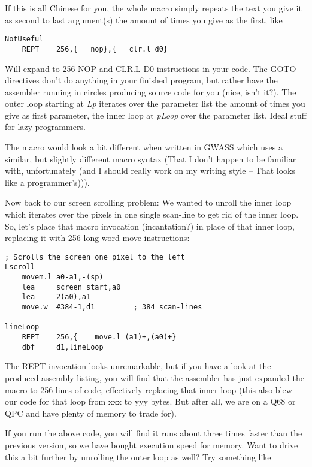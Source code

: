 If this is all Chinese for you, the whole macro simply repeats the text
you give it as second to last argument(s) the amount of times you give
as the first, like

\begin{lstlisting}[firstnumber=1,caption={A simple REPT example}]
NotUseful
    REPT    256,{   nop},{   clr.l d0}
\end{lstlisting}

Will expand to 256 NOP and CLR.L D0 instructions in your code. The GOTO
directives don't do anything in your finished program, but rather have
the assembler running in circles producing source code for you (nice,
isn't it?). The outer loop starting at \emph{Lp} iterates over the
parameter list the amount of times you give as first parameter, the
inner loop at \emph{pLoop} over the parameter list. Ideal stuff for lazy
programmers. 

\begin{note}
The macro would look a bit different when written in
GWASS which uses a similar, but slightly different macro syntax (That I
don't happen to be familiar with, unfortunately (and I should really
work on my writing style -- That looks like a programmer's))).
\end{note}

Now back to our screen scrolling problem: We wanted to unroll the inner
loop which iterates over the pixels in one single scan-line to get rid of
the inner loop. So, let's place that macro invocation (incantation?) in
place of that inner loop, replacing it with 256 long word move
instructions:

\begin{lstlisting}[firstnumber=1,caption={Unrolling the innner loop}]
; Scrolls the screen one pixel to the left
Lscroll
    movem.l a0-a1,-(sp)
    lea     screen_start,a0
    lea     2(a0),a1
    move.w  #384-1,d1         ; 384 scan-lines

lineLoop
    REPT    256,{    move.l (a1)+,(a0)+}
    dbf     d1,lineLoop
\end{lstlisting}

The REPT invocation looks unremarkable, but if you have a look at the
produced assembly listing, you will find that the assembler has just
expanded the macro to 256 lines of code, effectively replacing that
inner loop (this also blew our code for that loop from xxx to yyy bytes.
But after all, we are on a Q68 or QPC and have plenty of memory to trade
for).

If you run the above code, you will find it runs about three times
faster than the previous version, so we have bought execution speed for
memory. Want to drive this a bit further by unrolling the outer loop as
well? Try something like


